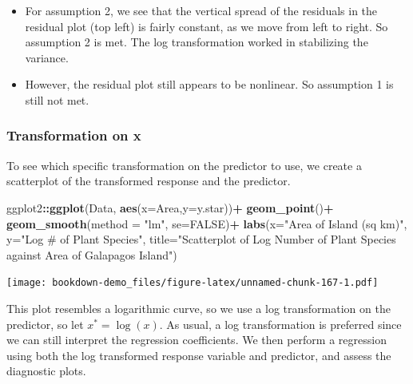\documentclass[
]{book}
\newenvironment{Shaded}{\begin{snugshade}}{\end{snugshade}}
\newcommand{\AttributeTok}[1]{\textcolor[rgb]{0.13,0.29,0.53}{#1}}
\newcommand{\ConstantTok}[1]{\textcolor[rgb]{0.56,0.35,0.01}{#1}}
\newcommand{\FunctionTok}[1]{\textcolor[rgb]{0.13,0.29,0.53}{\textbf{#1}}}
\newcommand{\NormalTok}[1]{#1}
\newcommand{\SpecialCharTok}[1]{\textcolor[rgb]{0.81,0.36,0.00}{\textbf{#1}}}
\newcommand{\StringTok}[1]{\textcolor[rgb]{0.31,0.60,0.02}{#1}}
\begin{document}
\begin{itemize}
\item
  For assumption 2, we see that the vertical spread of the residuals in the residual plot (top left) is fairly constant, as we move from left to right. So assumption 2 is met. The log transformation worked in stabilizing the variance.
\item
  However, the residual plot still appears to be nonlinear. So assumption 1 is still not met.
\end{itemize}

\hypertarget{transformation-on-x}{%
\subsubsection*{Transformation on x}\label{transformation-on-x}}

To see which specific transformation on the predictor to use, we create a scatterplot of the transformed response and the predictor.

\begin{Shaded}
\begin{Highlighting}[]
\NormalTok{ggplot2}\SpecialCharTok{::}\FunctionTok{ggplot}\NormalTok{(Data, }\FunctionTok{aes}\NormalTok{(}\AttributeTok{x=}\NormalTok{Area,}\AttributeTok{y=}\NormalTok{y.star))}\SpecialCharTok{+}
  \FunctionTok{geom\_point}\NormalTok{()}\SpecialCharTok{+}
  \FunctionTok{geom\_smooth}\NormalTok{(}\AttributeTok{method =} \StringTok{"lm"}\NormalTok{, }\AttributeTok{se=}\ConstantTok{FALSE}\NormalTok{)}\SpecialCharTok{+}
  \FunctionTok{labs}\NormalTok{(}\AttributeTok{x=}\StringTok{"Area of Island (sq km)"}\NormalTok{, }\AttributeTok{y=}\StringTok{"Log \# of Plant Species"}\NormalTok{, }
       \AttributeTok{title=}\StringTok{"Scatterplot of Log Number of Plant Species against Area of Galapagos Island"}\NormalTok{)}
\end{Highlighting}
\end{Shaded}

\texttt{[image: bookdown-demo\_files/figure-latex/unnamed-chunk-167-1.pdf]}

This plot resembles a logarithmic curve, so we use a log transformation on the predictor, so let \(x^{*} = \log(x)\). As usual, a log transformation is preferred since we can still interpret the regression coefficients. We then perform a regression using both the log transformed response variable and predictor, and assess the diagnostic plots.
\end{document}
